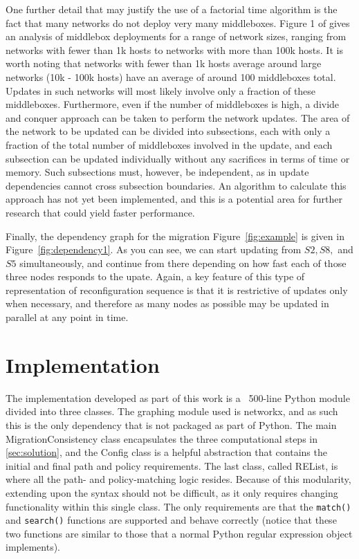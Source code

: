 \documentclass[pageno]{jpaper}
\begin{document}
One further detail that may justify the use of a factorial time algorithm is the fact that many networks do not deploy very many middleboxes. Figure 1 of \cite{sherry12} gives an analysis of middlebox deployments for a range of network sizes, ranging from networks with fewer than 1k hosts to networks with more than 100k hosts. It is worth noting that networks with fewer than 1k hosts average around  large networks (10k - 100k hosts) have an average of around 100 middleboxes total. Updates in such networks will most likely involve only a fraction of these middleboxes. Furthermore, even if the number of middleboxes is high, a divide and conquer approach can be taken to perform the network updates. The area of the network to be updated can be divided into subsections, each with only a fraction of the total number of middleboxes involved in the update, and each subsection can be updated individually without any sacrifices in terms of time or memory. Such subsections must, however, be independent, as in update dependencies cannot cross subsection boundaries. An algorithm to calculate this approach has not yet been implemented, and this is a potential area for further research that could yield faster performance.

Finally, the dependency graph for the migration Figure~\ref{fig:example} is given in Figure~\ref{fig:dependency1}. As you can see, we can start updating from $S2, S8,$ and $S5$ simultaneously, and continue from there depending on how fast each of those three nodes responds to the upate. Again, a key feature of this type of representation of reconfiguration sequence is that it is restrictive of updates only when necessary, and therefore as many nodes as possible may be updated in parallel at any point in time.

\section{Implementation}
\label{sec:implementation}
The implementation developed as part of this work is a ~500-line Python module divided into three classes. The graphing module used is networkx, and as such this is the only dependency that is not packaged as part of Python. The main Migration\textunderscore Consistency class encapsulates the three computational steps in \ref{sec:solution}, and the Config class is a helpful abstraction that contains the initial and final path and policy requirements. The last class, called REList, is where all the path- and policy-matching logic resides. Because of this modularity, extending upon the syntax should not be difficult, as it only requires changing functionality within this single class. The only requirements are that the \texttt{match()} and \texttt{search()} functions are supported and behave correctly (notice that these two functions are similar to those that a normal Python regular expression object implements).
\end{document}
